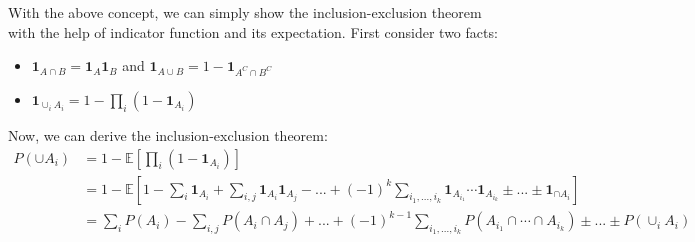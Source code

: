 \documentclass[../Transformation.tex]{subfiles}
\begin{document}
With the above concept, we can simply show the inclusion-exclusion theorem with the help of indicator function and its expectation. First consider two facts:
\begin{itemize}
	\item $\mathbf{1}_{A\cap B} = \mathbf{1}_A\mathbf{1}_B$ and $\mathbf{1}_{A\cup B} = 1-\mathbf{1}_{A^C\cap B^C}$
	\item $\mathbf{1}_{\cup_iA_i} = 1-\prod_i(1-\mathbf{1}_{A_i})$
\end{itemize}
Now, we can derive the inclusion-exclusion theorem:
\begin{align*}
P(\cup A_i) &= 1-\mathbb{E}[\prod_i(1-\mathbf{1}_{A_i})]\\
&= 1 - \mathbb{E}[1-\sum_i\mathbf{1}_{A_i} + \sum_{i,j}\mathbf{1}_{A_i}\mathbf{1}_{A_j}-...+(-1)^k\sum_{i_1,...,i_k}\mathbf{1}_{A_{i_1}}\cdots\mathbf{1}_{A_{i_k}}\pm...\pm\mathbf{1}_{\cap A_i}]\\
&=\sum_i P(A_i) - \sum_{i,j}P(A_i\cap A_j) +...+(-1)^{k-1}\sum_{i_1,...,i_k}P(A_{i_1}\cap\cdots\cap A_{i_k})\pm...\pm P(\cup_i A_i)
\end{align*}
\end{document}
